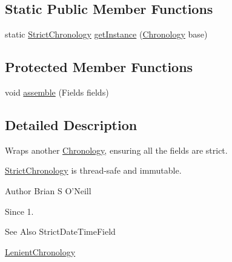 \subsection*{Static Public Member Functions}
\begin{DoxyCompactItemize}
\item 
static \hyperlink{classorg_1_1joda_1_1time_1_1chrono_1_1_strict_chronology}{Strict\-Chronology} \hyperlink{classorg_1_1joda_1_1time_1_1chrono_1_1_strict_chronology_ad4fe016e748166b85406f8067a12191d}{get\-Instance} (\hyperlink{classorg_1_1joda_1_1time_1_1_chronology}{Chronology} base)
\end{DoxyCompactItemize}
\subsection*{Protected Member Functions}
\begin{DoxyCompactItemize}
\item 
void \hyperlink{classorg_1_1joda_1_1time_1_1chrono_1_1_strict_chronology_a02833a52e87738eec3bf515d83bddab3}{assemble} (Fields fields)
\end{DoxyCompactItemize}


\subsection{Detailed Description}
Wraps another \hyperlink{classorg_1_1joda_1_1time_1_1_chronology}{Chronology}, ensuring all the fields are strict. 

\hyperlink{classorg_1_1joda_1_1time_1_1chrono_1_1_strict_chronology}{Strict\-Chronology} is thread-\/safe and immutable.

\begin{DoxyAuthor}{Author}
Brian S O'Neill 
\end{DoxyAuthor}
\begin{DoxySince}{Since}
1. 
\end{DoxySince}
\begin{DoxySeeAlso}{See Also}
Strict\-Date\-Time\-Field 

\hyperlink{classorg_1_1joda_1_1time_1_1chrono_1_1_lenient_chronology}{Lenient\-Chronology} 
\end{DoxySeeAlso}


